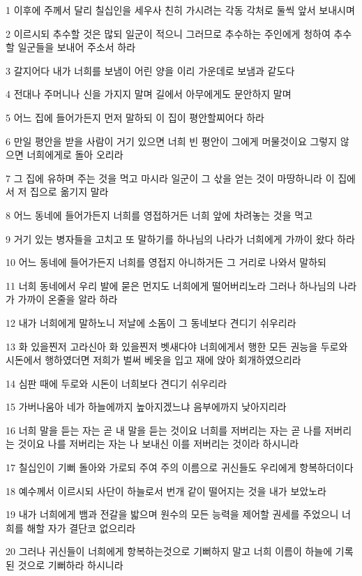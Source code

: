 \par 1 이후에 주께서 달리 칠십인을 세우사 친히 가시려는 각동 각처로 둘씩 앞서 보내시며
\par 2 이르시되 추수할 것은 많되 일군이 적으니 그러므로 추수하는 주인에게 청하여 추수할 일군들을 보내어 주소서 하라
\par 3 갈지어다 내가 너희를 보냄이 어린 양을 이리 가운데로 보냄과 같도다
\par 4 전대나 주머니나 신을 가지지 말며 길에서 아무에게도 문안하지 말며
\par 5 어느 집에 들어가든지 먼저 말하되 이 집이 평안할찌어다 하라
\par 6 만일 평안을 받을 사람이 거기 있으면 너희 빈 평안이 그에게 머물것이요 그렇지 않으면 너희에게로 돌아 오리라
\par 7 그 집에 유하며 주는 것을 먹고 마시라 일군이 그 삯을 얻는 것이 마땅하니라 이 집에서 저 집으로 옮기지 말라
\par 8 어느 동네에 들어가든지 너희를 영접하거든 너희 앞에 차려놓는 것을 먹고
\par 9 거기 있는 병자들을 고치고 또 말하기를 하나님의 나라가 너희에게 가까이 왔다 하라
\par 10 어느 동네에 들어가든지 너희를 영접지 아니하거든 그 거리로 나와서 말하되
\par 11 너희 동네에서 우리 발에 묻은 먼지도 너희에게 떨어버리노라 그러나 하나님의 나라가 가까이 온줄을 알라 하라
\par 12 내가 너희에게 말하노니 저날에 소돔이 그 동네보다 견디기 쉬우리라
\par 13 화 있을찐저 고라신아 화 있을찐저 벳새다야 너희에게서 행한 모든 권능을 두로와 시돈에서 행하였더면 저희가 벌써 베옷을 입고 재에 앉아 회개하였으리라
\par 14 심판 때에 두로와 시돈이 너희보다 견디기 쉬우리라
\par 15 가버나움아 네가 하늘에까지 높아지겠느냐 음부에까지 낮아지리라
\par 16 너희 말을 듣는 자는 곧 내 말을 듣는 것이요 너희를 저버리는 자는 곧 나를 저버리는 것이요 나를 저버리는 자는 나 보내신 이를 저버리는 것이라 하시니라
\par 17 칠십인이 기뻐 돌아와 가로되 주여 주의 이름으로 귀신들도 우리에게 항복하더이다
\par 18 예수께서 이르시되 사단이 하늘로서 번개 같이 떨어지는 것을 내가 보았노라
\par 19 내가 너희에게 뱀과 전갈을 밟으며 원수의 모든 능력을 제어할 권세를 주었으니 너희를 해할 자가 결단코 없으리라
\par 20 그러나 귀신들이 너희에게 항복하는것으로 기뻐하지 말고 너희 이름이 하늘에 기록된 것으로 기뻐하라 하시니라
